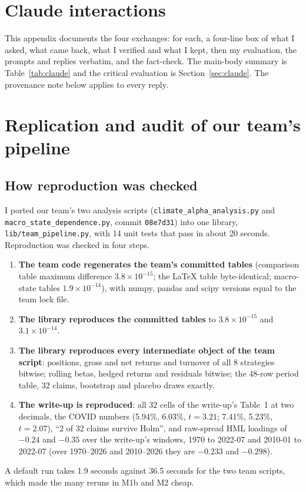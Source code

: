 \clearpage
\appendix
{}
\renewcommand{\runningtitle}{Read the Label: Appendices}

\section{Claude interactions}
\label{app:claude}

This appendix documents the four exchanges: for each, a four-line box of what I asked, what came back, what I verified and what I kept, then my evaluation, the prompts and replies verbatim, and the fact-check. The main-body summary is Table~\ref{tab:claude} and the critical evaluation is Section~\ref{sec:claude}. The provenance note below applies to every reply.



\clearpage
\section{Replication and audit of our team's pipeline}
\label{app:replication}

\subsection{How reproduction was checked}
I ported our team's two analysis scripts (\texttt{climate\_alpha\_\allowbreak analysis.py} and \texttt{macro\_state\_\allowbreak dependence.py}, commit \texttt{08e7d31}) into one library, \texttt{lib/\allowbreak team\_pipeline.py}, with 14 unit tests that pass in about 20 seconds. Reproduction was checked in four steps.
\begin{enumerate}
\item \textbf{The team code regenerates the team's committed tables} (comparison table maximum difference $3.8\times10^{-15}$; the \LaTeX{} table byte-identical; macro-state tables $1.9\times10^{-14}$), with numpy, pandas and scipy versions equal to the team lock file.
\item \textbf{The library reproduces the committed tables} to $3.8\times10^{-15}$ and $3.1\times10^{-14}$.
\item \textbf{The library reproduces every intermediate object of the team script}: positions, gross and net returns and turnover of all 8 strategies bitwise; rolling betas, hedged returns and residuals bitwise; the 48-row period table, 32 claims, bootstrap and placebo draws exactly.
\item \textbf{The write-up is reproduced}: all 32 cells of the write-up's Table~1 at two decimals, the COVID numbers (5.94\%, 6.03\%, $t=3.21$; 7.41\%, 5.23\%, $t=2.07$), ``2 of 32 claims survive Holm'', and raw-spread HML loadings of $-0.24$ and $-0.35$ over the write-up's windows, 1970 to 2022-07 and 2010-01 to 2022-07 (over 1970--2026 and 2010--2026 they are $-0.233$ and $-0.298$).
\end{enumerate}
A default run takes 1.9 seconds against 36.5 seconds for the two team scripts, which made the many reruns in M1b and M2 cheap.

